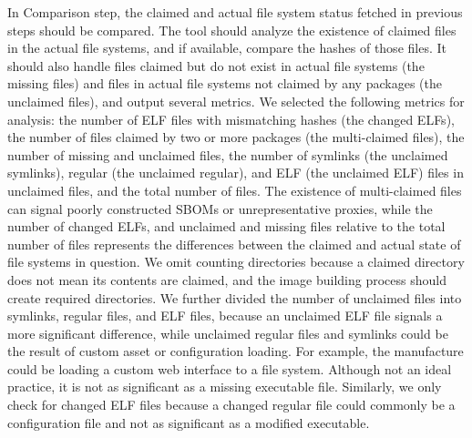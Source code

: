 In Comparison step, the claimed and actual file system status fetched in previous steps should be compared. The tool should analyze the existence of claimed files in the actual file systems, and if available, compare the hashes of those files. It should also handle files claimed but do not exist in actual file systems (the missing files) and files in actual file systems not claimed by any packages (the unclaimed files), and output several metrics. We selected the following metrics for analysis: the number of ELF files with mismatching hashes (the changed ELFs), the number of files claimed by two or more packages (the multi-claimed files), the number of missing and unclaimed files, the number of symlinks (the unclaimed symlinks), regular (the unclaimed regular), and ELF (the unclaimed ELF) files in unclaimed files, and the total number of files. The existence of multi-claimed files can signal poorly constructed SBOMs or unrepresentative proxies, while the number of changed ELFs, and unclaimed and missing files relative to the total number of files represents the differences between the claimed and actual state of file systems in question. We omit counting directories because a claimed directory does not mean its contents are claimed, and the image building process should create required directories. We further divided the number of unclaimed files into symlinks, regular files, and ELF files, because an unclaimed ELF file signals a more significant difference, while unclaimed regular files and symlinks could be the result of custom asset or configuration loading. For example, the manufacture could be loading a custom web interface to a file system. Although not an ideal practice, it is not as significant as a missing executable file. Similarly, we only check for changed ELF files because a changed regular file could commonly be a configuration file and not as significant as a modified executable. %
